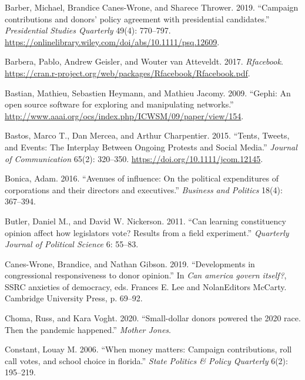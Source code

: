 \documentclass[12pt,]{article}
\begin{document}
\begin{CSLReferences}{1}{0}
\leavevmode{}%
Barber, Michael, Brandice Canes-Wrone, and Sharece Thrower. 2019.
{``Campaign contributions and donors' policy agreement with presidential
candidates.''} \emph{Presidential Studies Quarterly} 49(4): 770--797.
\url{https://onlinelibrary.wiley.com/doi/abs/10.1111/psq.12609}.

\leavevmode{}%
Barbera, Pablo, Andrew Geisler, and Wouter van Atteveldt. 2017.
\emph{Rfacebook}.
\url{https://cran.r-project.org/web/packages/Rfacebook/Rfacebook.pdf}.

\leavevmode{}%
Bastian, Mathieu, Sebastien Heymann, and Mathieu Jacomy. 2009. {``Gephi:
An open source software for exploring and manipulating networks.''}
\url{http://www.aaai.org/ocs/index.php/ICWSM/09/paper/view/154}.

\leavevmode{}%
Bastos, Marco T., Dan Mercea, and Arthur Charpentier. 2015. {``{Tents,
Tweets, and Events: The Interplay Between Ongoing Protests and Social
Media}.''} \emph{Journal of Communication} 65(2): 320--350.
\url{https://doi.org/10.1111/jcom.12145}.

\leavevmode{}%
Bonica, Adam. 2016. {``Avenues of influence: On the political
expenditures of corporations and their directors and executives.''}
\emph{Business and Politics} 18(4): 367--394.

\leavevmode{}%
Butler, Daniel M., and David W. Nickerson. 2011. {``Can learning
constituency opinion affect how legislators vote? Results from a field
experiment.''} \emph{Quarterly Journal of Political Science} 6: 55--83.

\leavevmode{}%
Canes-Wrone, Brandice, and Nathan Gibson. 2019. {``Developments in
congressional responsiveness to donor opinion.''} In \emph{Can america
govern itself?}, SSRC anxieties of democracy, eds. Frances E. Lee and
NolanEditors McCarty. Cambridge University Press, p. 69--92.

\leavevmode{}%
Choma, Russ, and Kara Voght. 2020. {``Small-dollar donors powered the
2020 race. Then the pandemic happened.''} \emph{Mother Jones}.

\leavevmode{}%
Constant, Louay M. 2006. {``When money matters: Campaign contributions,
roll call votes, and school choice in florida.''} \emph{State Politics
\& Policy Quarterly} 6(2): 195--219.


\end{CSLReferences}
\end{document}
